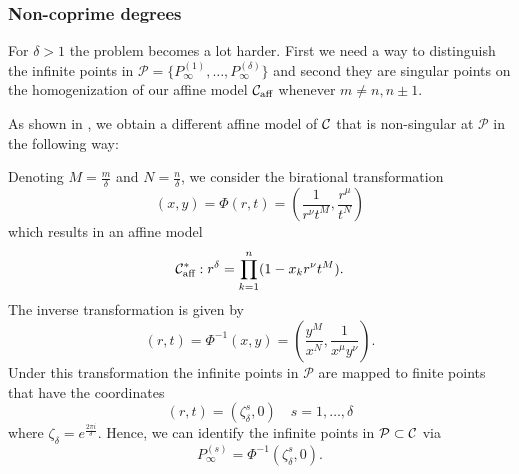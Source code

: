 \documentclass[main.tex]{subfiles}
\begin{document}
 \subsubsection{Non-coprime degrees}

  For $\delta > 1$ the problem becomes a lot harder. First we need a way to distinguish the infinite points in $\mathcal{P}
  = \{ P_{\infty}^{(1)},\dots, P_{\infty}^{(\delta)} \}$ and second they are singular points
  on the homogenization of our affine model $\mathcal{C}_{\text{aff}}$
  whenever $m \ne n,n\pm1$.
  
  As shown in \cite[\S 1]{CT1996}, we obtain a different affine model of $\mathcal{C}$ that is non-singular at $\mathcal{P}$
  in the following way:
  
  Denoting $M = \frac{m}\delta$ and $N = \frac{n}\delta$, we consider the birational transformation
  \begin{equation}
   (x,y) = \Phi(r,t) = \left(\frac{1}{r^{\nu}t^M},\frac{r^{\mu}}{t^N}\right)
  \end{equation}
  which results in an affine model
  \begin{equation}
   \mathcal{C}_{\text{aff}}^{*} : r^{\delta} = \prod_{k=1}^n (1-x_kr^{\nu}t^M).
  \end{equation}
  The inverse transformation is given by
  \begin{equation}
   (r,t) = \Phi^{-1}(x,y) = \left(\frac{y^M}{x^N},\frac{1}{x^{\mu}y^{\nu}}\right).
  \end{equation}
  Under this transformation the infinite points in $\mathcal{P}$ are mapped to finite points that have the coordinates
  \begin{equation}
   (r,t) = (\zeta_{\delta}^s,0) \quad s= 1,\dots,\delta
  \end{equation}
  where $\zeta_{\delta} = e^{\frac{2\pi i }{\delta}}$. 
  Hence, we can identify the infinite points in $\mathcal{P} \subset \mathcal{C}$ via
   \begin{equation}
      P_{\infty}^{(s)} = \Phi^{-1}(\zeta_{\delta}^s,0).
   \end{equation}
   
\end{document}
